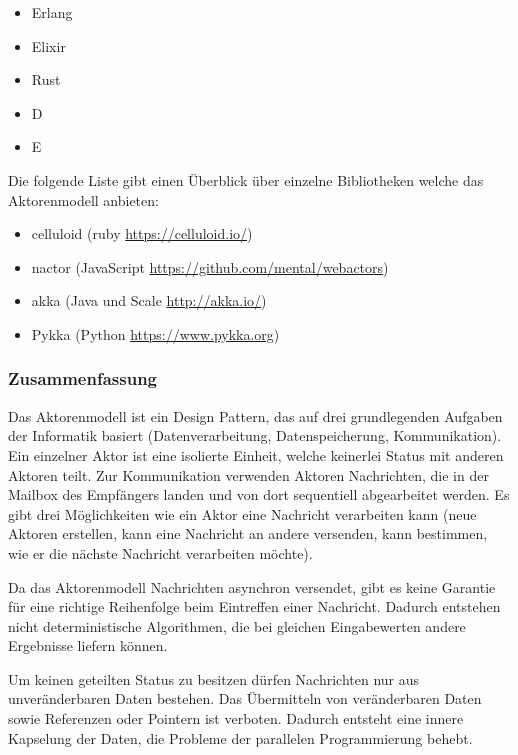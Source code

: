 \begin{itemize}
  \item Erlang
  \item Elixir
  \item Rust
  \item D
  \item E
\end{itemize}

Die folgende Liste gibt einen Überblick über einzelne Bibliotheken welche das Aktorenmodell anbieten:

\begin{itemize}
  \item celluloid (ruby \url{https://celluloid.io/})
  \item nactor (JavaScript \url{https://github.com/mental/webactors})
  \item akka (Java und Scale \url{http://akka.io/})
  \item Pykka (Python \url{https://www.pykka.org})
\end{itemize}

\subsubsection{Zusammenfassung}
Das Aktorenmodell ist ein Design Pattern, das auf drei grundlegenden Aufgaben der Informatik basiert (Datenverarbeitung, Datenspeicherung, Kommunikation). Ein einzelner Aktor ist eine isolierte Einheit, welche keinerlei Status mit anderen Aktoren teilt. Zur Kommunikation verwenden Aktoren Nachrichten, die in der Mailbox des Empfängers landen und von dort sequentiell abgearbeitet werden. Es gibt drei Möglichkeiten wie ein Aktor eine Nachricht verarbeiten kann (neue Aktoren erstellen, kann eine Nachricht an andere versenden, kann bestimmen, wie er die nächste Nachricht verarbeiten möchte).

Da das Aktorenmodell Nachrichten asynchron versendet, gibt es keine Garantie für eine richtige Reihenfolge beim Eintreffen einer Nachricht. Dadurch entstehen nicht deterministische Algorithmen, die bei gleichen Eingabewerten andere Ergebnisse liefern können.

Um keinen geteilten Status zu besitzen dürfen Nachrichten nur aus unveränderbaren Daten bestehen. Das Übermitteln von veränderbaren Daten sowie Referenzen oder Pointern ist verboten. Dadurch entsteht eine innere Kapselung der Daten, die Probleme der parallelen Programmierung behebt.